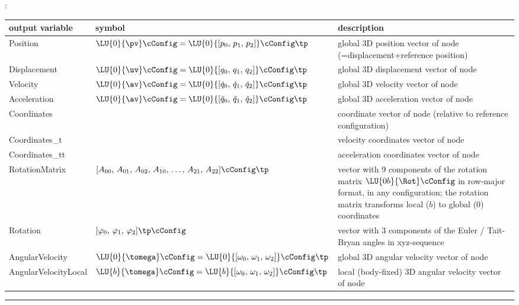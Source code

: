 :
\begin{center}
\footnotesize
\begin{longtable}{| p{5cm} | p{5cm} | p{6cm} |} 
\hline
\bf output variable & \bf symbol & \bf description \\ \hline
Position & $\LU{0}{\pv}\cConfig = \LU{0}{[p_0,\, p_1,\, p_2]}\cConfig\tp$ & global 3D position vector of node (=displacement+reference position)\\ \hline
Displacement & $\LU{0}{\uv}\cConfig = \LU{0}{[q_0,\, q_1,\, q_2]}\cConfig\tp$ & global 3D displacement vector of node\\ \hline
Velocity & $\LU{0}{\av}\cConfig = \LU{0}{[\dot q_0,\,\dot q_1,\,\dot q_2]}\cConfig\tp$ & global 3D velocity vector of node\\ \hline
Acceleration & $\LU{0}{\av}\cConfig = \LU{0}{[\ddot q_0,\,\ddot q_1,\,\ddot q_2]}\cConfig\tp$ & global 3D acceleration vector of node\\ \hline
Coordinates &  & coordinate vector of node (relative to reference configuration)\\ \hline
Coordinates\_t &  & velocity coordinates vector of node\\ \hline
Coordinates\_tt &  & acceleration coordinates vector of node\\ \hline
RotationMatrix & $[A_{00},\,A_{01},\,A_{02},\,A_{10},\,\ldots,\,A_{21},\,A_{22}]\cConfig\tp$ & vector with 9 components of the rotation matrix $\LU{0b}{\Rot}\cConfig$ in row-major format, in any configuration; the rotation matrix transforms local ($b$) to global (0) coordinates\\ \hline
Rotation & $[\varphi_0,\,\varphi_1,\,\varphi_2]\tp\cConfig$ & vector with 3 components of the Euler / Tait-Bryan angles in xyz-sequence\\ \hline
AngularVelocity & $\LU{0}{\tomega}\cConfig = \LU{0}{[\omega_0,\,\omega_1,\,\omega_2]}\cConfig\tp$ & global 3D angular velocity vector of node\\ \hline
AngularVelocityLocal & $\LU{b}{\tomega}\cConfig = \LU{b}{[\omega_0,\,\omega_1,\,\omega_2]}\cConfig\tp$ & local (body-fixed)  3D angular velocity vector of node\\ \hline
\end{longtable}
\end{center}
\vspace{6pt}\par\noindent\rule{\textwidth}{0.4pt}
